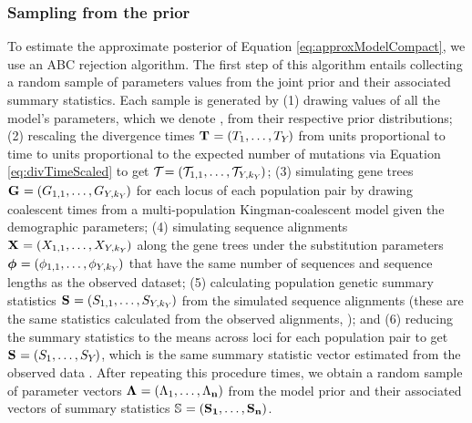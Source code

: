 \documentclass[letterpaper,12pt]{article}
\begin{document}
\begin{linenumbers}
\subsubsection*{Sampling from the prior}
To estimate the approximate posterior of Equation \ref{eq:approxModelCompact},
we use an ABC rejection algorithm.
The first step of this algorithm entails collecting a random sample of
parameters values from the joint prior and their associated summary
statistics.
Each sample is generated by
(1) drawing values of all the model's parameters, which we denote \hpvector{},
from their respective prior distributions;
(2) rescaling the divergence times
$\mathbf{T_{}} = (T_{1}, \ldots, T_{Y_{}})$
from units proportional to time to units proportional to the expected number
of mutations via Equation \ref{eq:divTimeScaled} to get 
$\divTimeScaledVector = (\divTimeScaled{1}{1}, \ldots,
\divTimeScaled{\npairs{}}{\nloci{\npairs{}}})$;
(3) simulating gene trees $\geneTreeVector = (\geneTree{1}{1}, \ldots, 
\geneTree{\npairs{}}{\nloci{\npairs{}}})$
for each locus of each population pair by drawing coalescent times from
a multi-population Kingman-coalescent model given the demographic parameters;
(4) simulating sequence alignments 
$\alignmentVector = (\alignment{1}{1}, \ldots, \alignment{\npairs{}}{\nloci{\npairs{}}})$
along the gene trees under the
\hky substitution parameters
$\hkyModelVector = (\hkyModel{1}{1}, \ldots, \hkyModel{\npairs{}}{\nloci{\npairs{}}})$
that have the same number of sequences and sequence lengths as the observed
dataset;
(5) calculating population genetic summary statistics
$\ssVector{} = (\alignmentSS{1}{1}, \ldots, \alignmentSS{\npairs{}}{\nloci{\npairs{}}})$
from the simulated sequence alignments (these are the same statistics
calculated from the observed alignments, \ssVectorObs{});
and (6) reducing the summary statistics to the means across loci for each
population pair to get
$\ssVector{} = (\alignmentSS{1}{}, \ldots, \alignmentSS{\npairs{}}{})$, which is
the same summary statistic vector estimated from the observed data \ssVectorObs.
After repeating this procedure \numPriorSamples times, we obtain a random
sample of parameter vectors
$\boldsymbol{\Lambda_{}} = (\Lambda_{1}, \ldots, \Lambda_{\mathbf{n}})$
from the model prior and their associated vectors of summary statistics
$\ssMatrix = (\ssVector{1}, \ldots, \ssVector{\numPriorSamples})$.


\end{linenumbers}
\end{document}
